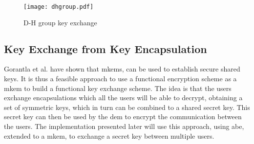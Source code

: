 \begin{figure}
\centering
\texttt{[image: dhgroup.pdf]}
\caption{D-H group key exchange}
\label{fig:dhgroup}
\end{figure}



\subsection{Key Exchange from Key Encapsulation}\label{subsec:ke-kem}
Gorantla et al. \cite{kem-group-ke} have shown that m\Glspl{kem}, can be used to establish secure shared keys. It is thus a feasible approach to use a functional encryption scheme as a m\Gls{kem} to build a functional key exchange scheme. The idea is that the users exchange encapsulations which all the users will be able to decrypt, obtaining a set of symmetric keys, which in turn can be combined to a shared secret key. This secret key can then be used by the \gls{dem} to encrypt the communication between the users. The implementation presented later will use this approach, using \gls{abe}, extended to a m\Gls{kem}, to exchange a secret key between multiple users.







